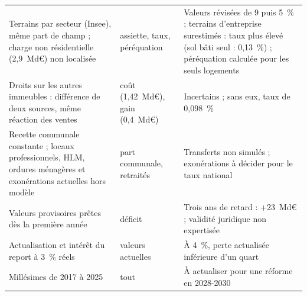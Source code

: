 \documentclass[11pt,a4paper]{article}
\begin{document}
\begin{table}[!htbp]
\begin{tabularx}{\linewidth}{@{}>{\raggedright\arraybackslash}p{4.3cm}>{\raggedright\arraybackslash}p{2.4cm}>{\raggedright\arraybackslash}X@{}}
Terrains par secteur (Insee), même part de champ ; charge non résidentielle (2,9~Md€) non localisée & assiette, taux, péréquation & Valeurs révisées de 9 puis 5~\% ; terrains d'entreprise surestimés : taux plus élevé (sol bâti seul : 0,13~\%) ; péréquation calculée pour les seuls logements \\
Droits sur les autres immeubles : différence de deux sources, même réaction des ventes & coût (1,42~Md€), gain (0,4~Md€) & Incertains ; sans eux, taux de 0,098~\% \\
Recette communale constante ; locaux professionnels, HLM, ordures ménagères et exonérations actuelles hors modèle & part communale, retraités & Transferts non simulés ; exonérations à décider pour le taux national \\
Valeurs provisoires prêtes dès la première année & déficit & Trois ans de retard : +23~Md€ ; validité juridique non expertisée \\
Actualisation et intérêt du report à 3~\% réels & valeurs actuelles & À 4~\%, perte actualisée inférieure d'un quart \\
Millésimes de 2017 à 2025 & tout & À actualiser pour une réforme en 2028-2030 \\
\bottomrule
\end{tabularx}
\end{table}
\end{document}
